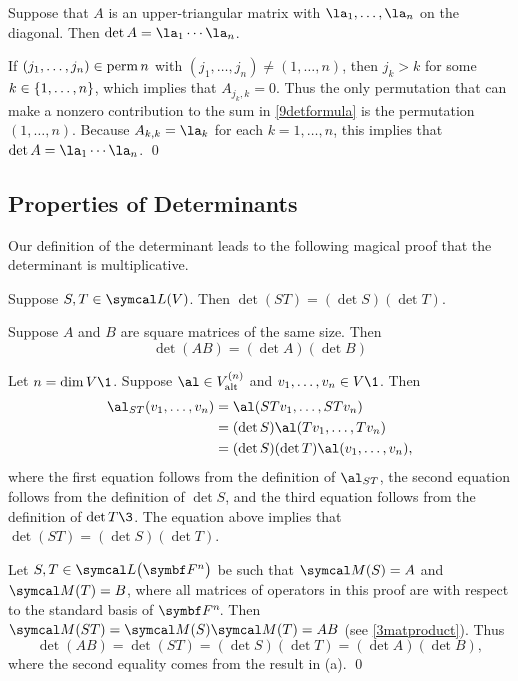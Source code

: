 {Suppose that $A$ is an upper-triangular matrix with $\la_1, \ldots, \la_n$ on the diagonal. Then $\det A = \la_1 \cdots \la_n$.}

\proof
If $(j_1, \ldots, j_n) \in \operatorname{perm} n$ with
$(j_1, \ldots, j_n) \ne (1, \ldots, n)$, then $j_k > k$ for some $k \in \{1, \ldots, n\}$, which implies that $A_{j_k, k} = 0$. Thus the only permutation that can make a nonzero contribution to the sum in \ref{9detformula} is the permutation $(1, \ldots, n)$. Because
$A_{k, k} = \la_k$ for each $k = 1, \ldots, n$, this implies that $\det A = \la_1 \cdots \la_n$.
\qed

\subsection{Properties of Determinants}

Our definition of the determinant leads to the following magical proof that the determinant is multiplicative.

{\begin{subtheorem}
\item
Suppose $S, T \in \L(V)$. Then
$
\det (ST) = (\det S)(\det T)$.
\item
Suppose $A$ and $B$ are square matrices of the same size. Then
\[
\det (AB) = (\det A)(\det B)
\]
\end{subtheorem}}

\proof
\begin{subtheorem}
\item
Let $n = \dim V\1$. Suppose $\al \in V^{(n)}_{\text{alt}}$ and $v_1, \ldots, v_n \in V\1$. Then
\begin{align*}
\al_{ST} (v_1, \ldots, v_n) &= \al( STv_1, \ldots, STv_n)\\
&= (\det S) \al(Tv_1, \ldots, Tv_n)\\
&= (\det S)(\det T) \al(v_1, \ldots, v_n),
\end{align*}
where the first equation follows from the definition of $\al_{ST}$, the second equation follows from the definition of $\det S$, and the third equation follows from the definition of $\det T\3$. The equation above implies that
$\det (ST) = (\det S)(\det T)$.

\item
Let $S, T \in \L\paren[\big]{ \F n }$ be such that $\M(S) = A$ and $\M(T) = B$, where all matrices of operators in this proof are with respect to the standard basis of $\FF n$. Then $\M(ST) = \M(S) \M(T) = AB$ (see \ref{3matproduct}). Thus
\[
\det(AB) = \det(ST) = (\det S)(\det T) = (\det A)(\det B),
\]
where the second equality comes from the result in (a).
\qed
\end{subtheorem}

